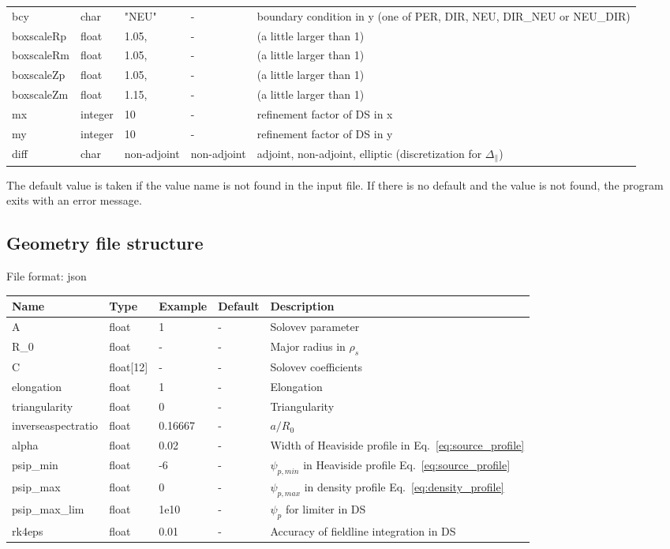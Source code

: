 \begin{longtable}{llll>{\RaggedRight}p{7cm}}
  bcy   & char & "NEU"      & - & boundary condition in y (one of PER, DIR, NEU, DIR\_NEU or NEU\_DIR) \\
  boxscaleRp & float &  1.05, & - & (a little larger than 1) \\
  boxscaleRm & float &  1.05, & - & (a little larger than 1) \\
  boxscaleZp & float &  1.05, & - & (a little larger than 1) \\
  boxscaleZm & float &  1.15, & - & (a little larger than 1) \\
  mx     & integer & 10 & - & refinement factor of DS in x \\
  my     & integer & 10 & - & refinement factor of DS in y \\
  diff       & char & non-adjoint & non-adjoint & adjoint, non-adjoint, elliptic (discretization for $\Delta_\parallel$) \\
\bottomrule
\end{longtable}

The default value is taken if the value name is not found in the input file. If there is no default and
the value is not found,
the program exits with an error message.

\subsection{Geometry file structure}
File format: json

\begin{longtable}{llll>{\RaggedRight}p{7cm}}
\toprule
\rowcolor{gray!50}\textbf{Name} &  \textbf{Type} & \textbf{Example} & \textbf{Default} & \textbf{Description}  \\ \midrule
    A      & float & 1 &  - & Solovev parameter \\
    R\_0   & float & - & -  & Major radius in $\rho_s$ \\
    C      & float[12] &  - & - & Solovev coefficients \\
    elongation & float & 1 & - & Elongation \\
    triangularity & float & 0 & - & Triangularity \\
    inverseaspectratio & float & 0.16667 & - & $a/R_0$ \\
    alpha  & float & 0.02 & - & Width of Heaviside profile in Eq.~\eqref{eq:source_profile} \\
    psip\_min & float & -6 & - & $\psi_{p,min}$ in Heaviside profile Eq.~\eqref{eq:source_profile} \\
    psip\_max & float & 0 & - & $\psi_{p,max}$ in density profile Eq.~\eqref{eq:density_profile} \\
    psip\_max\_lim & float & 1e10 & - & $\psi_p$ for limiter in DS \\
    rk4eps & float & 0.01 & - & Accuracy of fieldline integration in DS \\
\bottomrule
\end{longtable}

